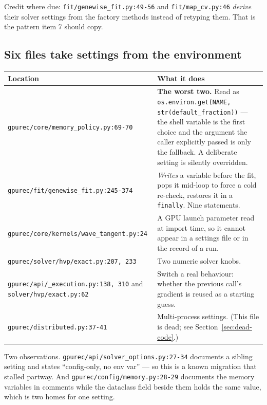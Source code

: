 \documentclass[11pt]{article}
\newcommand{\loc}[1]{\nolinkurl{#1}}
\begin{document}
Credit where due: \loc{fit/genewise\_fit.py:49-56} and \loc{fit/map\_cv.py:46}
\emph{derive} their solver settings from the factory methods instead of
retyping them.  That is the pattern item 7 should copy.

\subsection{Six files take settings from the environment}
\label{sec:envvars}

\begin{center}
\begin{longtable}{@{}p{}p{}@{}}
\toprule
Location & What it does \\
\midrule
\endhead
\loc{gpurec/core/memory\_policy.py:69-70}
  & \textbf{The worst two.}  Read as
    \texttt{os.environ.get(NAME, str(default\_fraction))} --- the shell variable
    is the first choice and the argument the caller explicitly passed is only
    the fallback.  A deliberate setting is silently overridden. \\
\loc{gpurec/fit/genewise\_fit.py:245-374}
  & \emph{Writes} a variable before the fit, pops it mid-loop to force a cold
    re-check, restores it in a \texttt{finally}.  Nine statements. \\
\loc{gpurec/core/kernels/wave\_tangent.py:24}
  & A GPU launch parameter read at import time, so it cannot appear in a
    settings file or in the record of a run. \\
\loc{gpurec/solver/hvp/exact.py:207, 233}
  & Two numeric solver knobs. \\
\loc{gpurec/api/\_execution.py:138, 310} and \loc{solver/hvp/exact.py:62}
  & Switch a real behaviour: whether the previous call's gradient is reused as
    a starting guess. \\
\loc{gpurec/distributed.py:37-41}
  & Multi-process settings.  (This file is dead; see
    Section~\ref{sec:dead-code}.) \\
\bottomrule
\end{longtable}
\end{center}

Two observations.  \loc{gpurec/api/solver\_options.py:27-34} documents a sibling
setting and states ``config-only, no env var'' --- so this is a known migration
that stalled partway.  And \loc{gpurec/config/memory.py:28-29} documents the
memory variables in comments while the dataclass field beside them holds the
same value, which is two homes for one setting.
\end{document}
